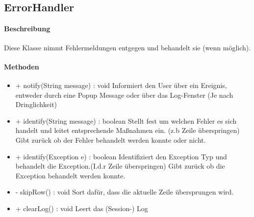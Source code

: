 \subsection{ErrorHandler}

\paragraph{Beschreibung}
Diese Klasse nimmt Fehlermeldungen entgegen und behandelt sie (wenn möglich).


\paragraph{Methoden}

\begin{itemize}
\item + notify(String message) : void
Informiert den User über ein Ereignis, entweder durch eine Popup Message oder über das Log-Fenster (Je nach Dringlichkeit)

\item + identify(String message) : boolean
Stellt fest um welchen Fehler es sich handelt und leitet entsprechende Maßnahmen ein. (z.b Zeile überspringen)
Gibt zurück ob der Fehler behandelt werden konnte oder nicht.

\item + identify(Exception e) : boolean
Identifiziert den Exception Typ und behandelt die Exception.(I.d.r Zeile überspringen)
Gibt zurück ob die Exception behandelt werden konnte.

\item - skipRow() : void
Sort dafür, dass die aktuelle Zeile übersprungen wird.

\item + clearLog() : void
Leert das (Session-) Log
\end{itemize}